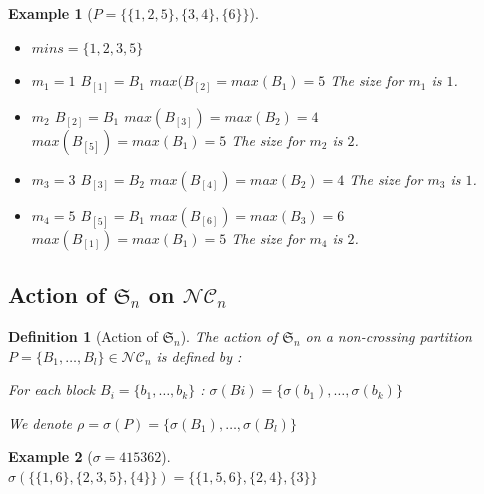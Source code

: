 \documentclass[12pt]{report}
\newtheorem{definition}{Definition}
\newtheorem*{example}{Example}
\begin{document}
\begin{example}[$P = \{\{1, 2, 5\}, \{3, 4\}, \{6\}\}$]
    ~\\
    \begin{itemize}
        \item $mins = \{1, 2, 3, 5\}$
        \item $m_1 = 1$
            \subitem $B_{[1]} = B_1$
            \subitem $max (B_{[2]} = max (B_1) = 5$
            \subitem The size for $m_1$ is $1$.
        \item $m_2$
            \subitem $B_{[2]} = B_1$
            \subitem $max (B_{[3]}) = max (B_2) = 4$
            \subitem $max (B_{[5]}) = max (B_1) = 5$
            \subitem The size for $m_2$ is $2$.
        \item $m_3 = 3$
            \subitem $B_{[3]} = B_2$
            \subitem $max (B_{[4]}) = max (B_2) = 4$
            \subitem The size for $m_3$ is $1$.
        \item $m_4 = 5$
            \subitem $B_{[5]} = B_1$
            \subitem $max (B_{[6]}) = max (B_3) = 6$
            \subitem $max (B_{[1]}) = max (B_1) = 5$
            \subitem The size for $m_4$ is $2$.
    \end{itemize}
\end{example}

\subsection{Action of $\mathfrak{S}_n$ on $\mathcal{NC}_n$}

\begin{definition}[Action of $\mathfrak{S}_n$]
    The action of $\mathfrak{S}_n$ on a non-crossing partition
    $P = \{B_1, \ldots, B_l\} \in \mathcal{NC}_n$ is defined by :\\
    \begin{itemize*}
        \item For each block $B_i = \{b_1, \ldots, b_k\}$ :
        $\sigma(Bi) =\{\sigma (b_1), \ldots, \sigma (b_k)\}$ \\
        \item We denote $\rho = \sigma(P) =
            \{\sigma (B_1), \ldots, \sigma (B_l)\}$
    \end{itemize*}
\end{definition}

\begin{example}[$\sigma = 415362$]
    ~\\
    $\sigma (\{\{1, 6\}, \{2, 3, 5\}, \{4\}\}) = 
        \{\{1, 5, 6\}, \{2, 4\}, \{3\}\}$
\end{example}
\end{document}
